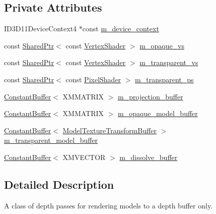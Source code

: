 \subsection*{Private Attributes}
\begin{DoxyCompactItemize}
\item 
I\+D3\+D11\+Device\+Context4 $\ast$const \hyperlink{classmage_1_1_depth_pass_a900800a2d00c1855523a77ec488221fe}{m\+\_\+device\+\_\+context}
\item 
const \hyperlink{namespacemage_a1e01ae66713838a7a67d30e44c67703e}{Shared\+Ptr}$<$ const \hyperlink{classmage_1_1_vertex_shader}{Vertex\+Shader} $>$ \hyperlink{classmage_1_1_depth_pass_aa410d0303d18d621a7894695b87ccfc2}{m\+\_\+opaque\+\_\+vs}
\item 
const \hyperlink{namespacemage_a1e01ae66713838a7a67d30e44c67703e}{Shared\+Ptr}$<$ const \hyperlink{classmage_1_1_vertex_shader}{Vertex\+Shader} $>$ \hyperlink{classmage_1_1_depth_pass_a0227142e9867e0599c770bdbe0c2241c}{m\+\_\+transparent\+\_\+vs}
\item 
const \hyperlink{namespacemage_a1e01ae66713838a7a67d30e44c67703e}{Shared\+Ptr}$<$ const \hyperlink{namespacemage_a27ecaf266420ee7a494d64edc0757129}{Pixel\+Shader} $>$ \hyperlink{classmage_1_1_depth_pass_a5b6a53892db2e9d9fd1a21c3b8cf6d19}{m\+\_\+transparent\+\_\+ps}
\item 
\hyperlink{classmage_1_1_constant_buffer}{Constant\+Buffer}$<$ X\+M\+M\+A\+T\+R\+IX $>$ \hyperlink{classmage_1_1_depth_pass_a4c9833ceaf223b73404edab4cf81b7c1}{m\+\_\+projection\+\_\+buffer}
\item 
\hyperlink{classmage_1_1_constant_buffer}{Constant\+Buffer}$<$ X\+M\+M\+A\+T\+R\+IX $>$ \hyperlink{classmage_1_1_depth_pass_a4e466580656eb0602d2e00c29b2435a0}{m\+\_\+opaque\+\_\+model\+\_\+buffer}
\item 
\hyperlink{classmage_1_1_constant_buffer}{Constant\+Buffer}$<$ \hyperlink{structmage_1_1_model_texture_transform_buffer}{Model\+Texture\+Transform\+Buffer} $>$ \hyperlink{classmage_1_1_depth_pass_a4b6a38c56e02b6185c1eef8bcaaa5786}{m\+\_\+transparent\+\_\+model\+\_\+buffer}
\item 
\hyperlink{classmage_1_1_constant_buffer}{Constant\+Buffer}$<$ X\+M\+V\+E\+C\+T\+OR $>$ \hyperlink{classmage_1_1_depth_pass_ab8ef293d922a965a92825b8226b9d87c}{m\+\_\+dissolve\+\_\+buffer}
\end{DoxyCompactItemize}


\subsection{Detailed Description}
A class of depth passes for rendering models to a depth buffer only. 

